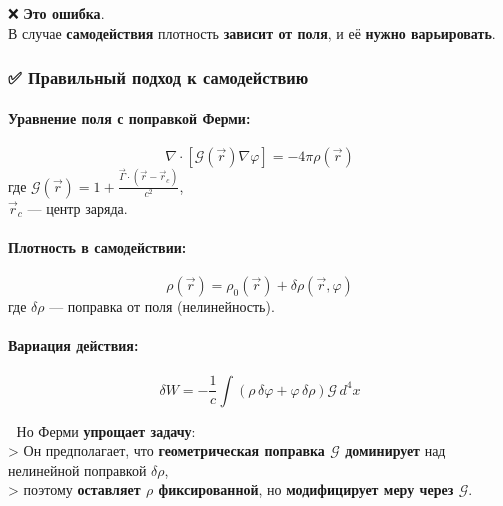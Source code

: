 \documentclass[11pt]{article}
\begin{document}
❌ \textbf{Это ошибка}.\\
В случае \textbf{самодействия} плотность \textbf{зависит от поля}, и её
\textbf{нужно варьировать}.

\subsubsection{✅ Правильный подход к
самодействию}\label{ux43fux440ux430ux432ux438ux43bux44cux43dux44bux439-ux43fux43eux434ux445ux43eux434-ux43a-ux441ux430ux43cux43eux434ux435ux439ux441ux442ux432ux438ux44e}

\paragraph{Уравнение поля с поправкой
Ферми:}\label{ux443ux440ux430ux432ux43dux435ux43dux438ux435-ux43fux43eux43bux44f-ux441-ux43fux43eux43fux440ux430ux432ux43aux43eux439-ux444ux435ux440ux43cux438}

\[
\nabla \cdot \left[ \mathcal{G}(\vec{r}) \nabla \varphi \right] = -4\pi \rho(\vec{r})
\] где
\(\mathcal{G}(\vec{r}) = 1 + \frac{\vec{\Gamma} \cdot (\vec{r} - \vec{r}_c)}{c^2}\),\\
\(\vec{r}_c\) --- центр заряда.

\paragraph{Плотность в
самодействии:}\label{ux43fux43bux43eux442ux43dux43eux441ux442ux44c-ux432-ux441ux430ux43cux43eux434ux435ux439ux441ux442ux432ux438ux438}

\[
\rho(\vec{r}) = \rho_0(\vec{r}) + \delta \rho(\vec{r}, \varphi)
\] где \(\delta \rho\) --- поправка от поля (нелинейность).

\paragraph{Вариация
действия:}\label{ux432ux430ux440ux438ux430ux446ux438ux44f-ux434ux435ux439ux441ux442ux432ux438ux44f}

\[
\delta W = -\frac{1}{c} \int \left( \rho \, \delta \varphi + \varphi \, \delta \rho \right) \mathcal{G} \, d^4x
\]

📌 Но Ферми \textbf{упрощает задачу}:\\
\textgreater{} Он предполагает, что \textbf{геометрическая поправка
\(\mathcal{G}\) доминирует} над нелинейной поправкой \(\delta \rho\),\\
\textgreater{} поэтому \textbf{оставляет \(\rho\) фиксированной}, но
\textbf{модифицирует меру через \(\mathcal{G}\)}.
\end{document}
